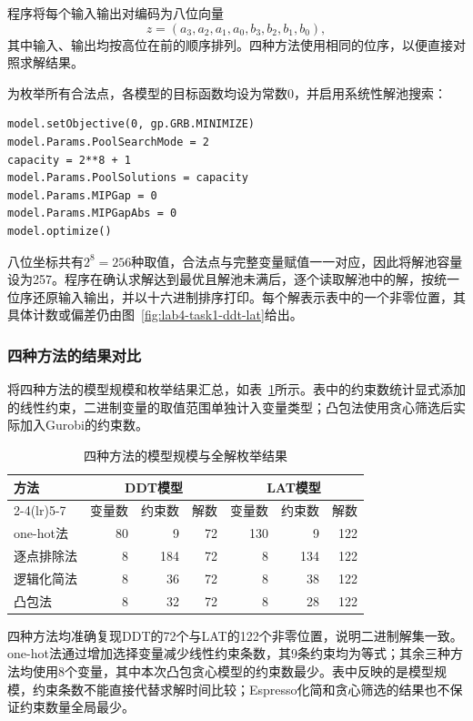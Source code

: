 程序将每个输入输出对编码为八位向量
\[
z=(a_3,a_2,a_1,a_0,b_3,b_2,b_1,b_0),
\]
其中输入、输出均按高位在前的顺序排列。四种方法使用相同的位序，以便直接对照求解结果。

为枚举所有合法点，各模型的目标函数均设为常数0，并启用系统性解池搜索：
\begin{lstlisting}
model.setObjective(0, gp.GRB.MINIMIZE)
model.Params.PoolSearchMode = 2
capacity = 2**8 + 1
model.Params.PoolSolutions = capacity
model.Params.MIPGap = 0
model.Params.MIPGapAbs = 0
model.optimize()
\end{lstlisting}

八位坐标共有$2^8=256$种取值，合法点与完整变量赋值一一对应，因此将解池容量设为257。程序在确认求解达到最优且解池未满后，逐个读取解池中的解，按统一位序还原输入输出，并以十六进制排序打印。每个解表示表中的一个非零位置，其具体计数或偏差仍由图~\ref{fig:lab4-task1-ddt-lat}给出。






\clearpage
\subsubsection{四种方法的结果对比}

将四种方法的模型规模和枚举结果汇总，如表~\ref{tab:lab4-task1-comparison}所示。表中的约束数统计显式添加的线性约束，二进制变量的取值范围单独计入变量类型；凸包法使用贪心筛选后实际加入Gurobi的约束数。

\begin{table}[H]
    \centering
    \caption{四种方法的模型规模与全解枚举结果}
    \label{tab:lab4-task1-comparison}
    \begin{tabular}{lrrrrrr}
        \toprule
        \multirow{2}{*}{方法} & \multicolumn{3}{c}{DDT模型} & \multicolumn{3}{c}{LAT模型} \\
        \cmidrule(lr){2-4}\cmidrule(lr){5-7}
        & 变量数 & 约束数 & 解数 & 变量数 & 约束数 & 解数 \\
        \midrule
        one-hot法 & 80 & 9 & 72 & 130 & 9 & 122 \\
        逐点排除法 & 8 & 184 & 72 & 8 & 134 & 122 \\
        逻辑化简法 & 8 & 36 & 72 & 8 & 38 & 122 \\
        凸包法 & 8 & 32 & 72 & 8 & 28 & 122 \\
        \bottomrule
    \end{tabular}
\end{table}

四种方法均准确复现DDT的72个与LAT的122个非零位置，说明二进制解集一致。one-hot法通过增加选择变量减少线性约束条数，其9条约束均为等式；其余三种方法均使用8个变量，其中本次凸包贪心模型的约束数最少。表中反映的是模型规模，约束条数不能直接代替求解时间比较；Espresso化简和贪心筛选的结果也不保证约束数量全局最少。
